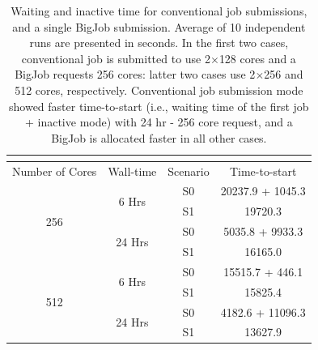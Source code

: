 \documentclass[preprint,12pt]{elsarticle}
\begin{document}
\begin{table}
  \caption{\small Waiting and inactive time for conventional job submissions, 
and a single BigJob submission. Average of 10 independent runs are presented in seconds. 
In the first two cases, conventional job is submitted to use 2$\times$128 cores and 
a BigJob requests 256 cores: latter two cases use 2$\times$256 and 512 cores, 
respectively. Conventional job submission mode showed faster time-to-start 
(i.e., waiting time of the first job + inactive mode) with 24 hr - 256 core request,
and a BigJob is allocated faster in all other cases.}
\label{table:BJwaiting}
\centering
\footnotesize
 \begin{tabular}{c | c | c | c }
 \multicolumn{4}{c}{\phantom{\tiny 100}}\\
\hline
Number of Cores & Wall-time & Scenario & Time-to-start\\
\hline
\hline
\multirow{4}{0.1\textwidth}{256} & \multirow{2}{0.1\textwidth}{6 Hrs} & S0 & 20237.9 + 1045.3\\
\cline{3-4}
&  & S1 & 19720.3\\
\cline{2-4}
& \multirow{2}{0.1\textwidth}{24 Hrs} & S0 & 5035.8 + 9933.3\\
\cline{3-4}
&  & S1 & 16165.0\\
\hline
 \multirow{4}{0.1\textwidth}{512}& \multirow{2}{0.1\textwidth}{6 Hrs} & S0 & 15515.7 + 446.1\\
\cline{3-4}
&  & S1 & 15825.4\\
\cline{2-4}
& \multirow{2}{0.1\textwidth}{24 Hrs} & S0 & 4182.6 + 11096.3\\
\cline{3-4}
&  & S1 & 13627.9\\
\hline
\end{tabular} %
\vspace{-1em}
\end{table}
\end{document}
